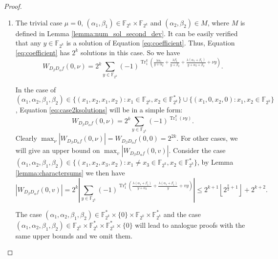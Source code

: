 \documentclass{article}
\newcommand{\F}{\mathbb{F}}
\newcommand{\0}{\textbf{0}}
\newcommand{\1}{\textbf{1}}
\newcommand{\TRACE}{\operatorname{Tr}_1^k}
\theoremstyle{plain}
\begin{document}
\begin{proof}
        \begin{enumerate}[label=\textbf{Case \arabic*},wide = 0pt]
            \item The trivial case $\mu=0$, $(\alpha_1,\beta_1)\in\F_{2^k}\times\F_{2^k}$ and $(\alpha_2,\beta_2)\in M$, where $M$ is defined in Lemma \ref{lemma:num_sol_second_dev}.
            It can be easily verified that any $y\in \F_{2^k}$ is a solution of Equation \eqref{eq:coefficient}.
            Thus, Equation \eqref{eq:coefficient} has $2^k$ solutions in this case.
            So we have
            \begin{equation}\label{eq:case2ksolutions}
                W_{D_{\beta}D_{\alpha}f}(0,\nu)=2^k\sum_{y\in\F_{2^k}}(-1)^{\TRACE\left(\frac{\lambda\alpha_1}{y+\alpha_2}+\frac{\lambda\beta_1}{y+\beta_2}+\frac{\lambda(\alpha_1+\beta_1)}{y+\alpha_2+\beta_2}+\nu y\right)}.
            \end{equation}

            In the case of
            $(\alpha_1,\alpha_2,\beta_1,\beta_2)\in\{(x_1,x_2,x_1,x_2):x_1\in\F_{2^k},x_2\in\F_{2^k}^*\}\cup\{(x_1,0,x_2,0):x_1,x_2\in\F_{2^k}\}$,
            Equation \eqref{eq:case2ksolutions} will be in a simple form:
            \[W_{D_{\beta}D_{\alpha}f}(0,\nu)=2^k\sum_{y\in\F_{2^k}}(-1)^{\TRACE\left(\nu y\right)}.\]
            Clearly $\max_{\nu}|W_{D_{\beta}D_{\alpha}f}(0,\nu)|=W_{D_{\beta}D_{\alpha}f}(0,0)=2^{2k}$.
            For other cases, we will give an upper bound on $\max_{v}|W_{D_{\beta}D_{\alpha}f}(0,v)|$.
            Consider the case $(\alpha_1,\alpha_2,\beta_1,\beta_2)\in\{(x_1,x_2,x_3,x_2):x_1\ne x_3\in\F_{2^k},x_2\in\F_{2^k}^*\}$,
            by Lemma \ref{lemma:charactersums} we then have
            \[\left\lvert W_{D_{\beta}D_{\alpha}f}(0,v)\right\rvert =2^k\left\lvert \sum_{y\in\F_{2^k}}(-1)^{\TRACE\left(\frac{\lambda(\alpha_1+\beta_1)}{y+\alpha_2}+\frac{\lambda(\alpha_1+\beta_1)}{y}+vy\right)}\right\rvert\le 2^{k+1}\left\lfloor 2^{\frac{k}{2}+1}\right\rfloor+2^{k+2}.\]

            The case $(\alpha_1,\alpha_2,\beta_1,\beta_2)\in\F_{2^k}^*\times\{0\}\times\F_{2^k}\times\F_{2^k}^*$ and the case $(\alpha_1,\alpha_2,\beta_1,\beta_2)\in\F_{2^k}\times\F_{2^k}^*\times\F_{2^k}^*\times\{0\}$ will lead to analogue proofs with the same upper bounds and we omit them.


\end{enumerate}
\end{proof}
\end{document}
